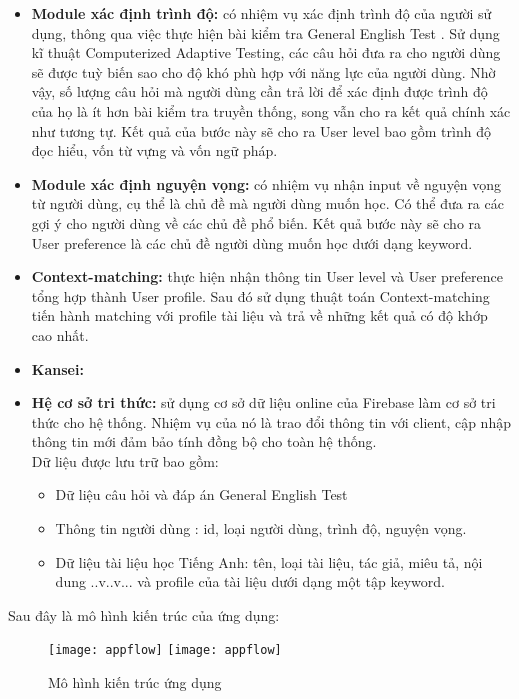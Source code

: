 \begin{itemize}
	\item \textbf{Module xác định trình độ:} có nhiệm vụ xác định trình độ của người sử dụng, thông qua việc thực hiện bài kiểm tra General English Test . Sử dụng kĩ thuật Computerized Adaptive Testing, các câu hỏi đưa ra cho người dùng sẽ được tuỳ biến sao cho độ khó phù hợp với năng lực của người dùng. Nhờ vậy, số lượng câu hỏi mà người dùng cần trả lời để xác định được trình độ của họ là ít hơn bài kiểm tra truyền thống, song vẫn cho ra kết quả chính xác như tương tự. Kết quả của bước này sẽ cho ra User level bao gồm trình độ đọc hiểu, vốn từ vựng và vốn ngữ pháp.
	\item \textbf{Module xác định nguyện vọng:} có nhiệm vụ nhận input về nguyện vọng từ người dùng, cụ thể là chủ đề mà người dùng muốn học. Có thể đưa ra các gợi ý cho người dùng về các chủ đề phổ biến. Kết quả bước này sẽ cho ra User preference là các chủ đề người dùng muốn học dưới dạng keyword.
	\item \textbf{Context-matching:} thực hiện nhận thông tin User level và User preference tổng hợp thành User profile. Sau đó sử dụng thuật toán Context-matching tiến hành matching với profile tài liệu và trả về những kết quả có độ khớp cao nhất.
	\item \textbf{Kansei:}
	\item \textbf{Hệ cơ sở tri thức:} sử dụng cơ sở dữ liệu online của Firebase làm cơ sở tri thức cho hệ thống. Nhiệm vụ của nó là trao đổi thông tin với client, cập nhập thông tin mới đảm bảo tính đồng bộ cho toàn hệ thống. \\Dữ liệu được lưu trữ bao gồm:
		\begin{itemize}
			\item Dữ liệu câu hỏi và đáp án General English Test
			\item Thông tin người dùng : id, loại người dùng, trình độ, nguyện vọng.
			\item Dữ liệu tài liệu học Tiếng Anh: tên, loại tài liệu, tác giả, miêu tả, nội dung ..v..v... và profile của tài liệu dưới dạng một tập keyword.
		\end{itemize}
\end{itemize}

Sau đây là mô hình kiến trúc của ứng dụng:

\begin{figure}[H]
  \begin{center}
    \ifpdf
      \texttt{[image: appflow]}
    \else
      \texttt{[image: appflow]}
    \fi
    \caption{Mô hình kiến trúc ứng dụng}
    \label{Appflow}
  \end{center}
\end{figure}



